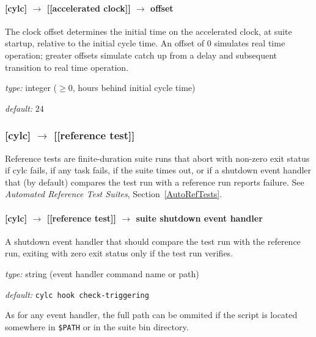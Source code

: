 \paragraph[offset]{[cylc] $\rightarrow$ [[accelerated clock]] $\rightarrow$ offset}

The clock offset determines the initial time on the accelerated clock, 
at suite startup, relative to the initial cycle time. An offset of
$0$ simulates real time operation; greater offsets simulate catch up
from a delay and subsequent transition to real time operation.

\begin{myitemize}
    \item {\em type:} integer ($\geq 0$, hours behind initial cycle time)
    \item {\em default:} $24$
\end{myitemize}


\subsubsection[{[[}reference test{]]}]{[cylc] $\rightarrow$ [[reference test]] }
\label{ReferenceTestConfig}

Reference tests are finite-duration suite runs that abort with non-zero
exit status if cylc fails, if any task fails, if the suite times
out, or if a shutdown event handler that (by default) compares the test
run with a reference run reports failure. See {\em Automated Reference Test
Suites}, Section~\ref{AutoRefTests}.

\paragraph[suite shutdown event handler]{[cylc] $\rightarrow$ [[reference test]] $\rightarrow$ suite shutdown event handler}

A shutdown event handler that should compare the test run with the
reference run, exiting with zero exit status only if the test run
verifies.

\begin{myitemize}
    \item {\em type:} string (event handler command name or path)
    \item {\em default:} \lstinline=cylc hook check-triggering=
\end{myitemize}
As for any event handler, the full path can be ommited if the script is
located somewhere in \lstinline=$PATH= or in the suite bin directory.

